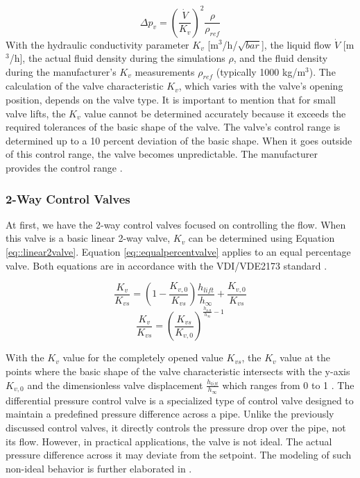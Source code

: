\begin{equation}\label{eq::realminorpres}
    \Delta p_{v} = \left( \frac{\dot{V}}{K_v} \right)^{2} \frac{\rho}{\rho_{ref}}    
\end{equation}
With the hydraulic conductivity parameter $K_v$  [m$^3$/h/$\sqrt{bar}$], the liquid flow $\dot{V}$ [m$^3$/h], the actual fluid density during the simulations $\rho$, and the fluid density during the manufacturer's $K_v$ measurements $\rho_{ref}$ (typically 1000 kg/m$^3$). The calculation of the valve characteristic $K_v$, which varies with the valve's opening position, depends on the valve type. It is important to mention that for small valve lifts, the $K_v$ value cannot be determined accurately because it exceeds the required tolerances of the basic shape of the valve. The valve's control range is determined up to a 10 percent deviation of the basic shape. When it goes outside of this control range, the valve becomes unpredictable. The manufacturer provides the control range \cite{echtephdthesis}.

\subsubsection{2-Way Control Valves}
At first, we have the 2-way control valves focused on controlling the flow. When this valve is a basic linear 2-way valve, $K_v$ can be determined using Equation \ref{eq::linear2valve}. Equation \ref{eq::equalpercentvalve} applies to an equal percentage valve. Both equations are in accordance with the VDI/VDE2173 standard \cite{VDI/VDE2713}. 

\begin{equation}\label{eq::linear2valve}
    \frac{K_v}{K_{vs}} = \left( 1 -\frac{K_{v,0}}{K_{vs}} \right) \frac{h_{lift}}{h_{\infty}} + \frac{K_{v,0}}{K_{vs}}
\end{equation}
\begin{equation}\label{eq::equalpercentvalve}
    \frac{K_v}{K_{vs}} = {\left(\frac{K_{vs}}{K_{v,0}} \right)}^{\frac{h_{lift}}{h_{\infty}} - 1}
\end{equation}

With the $K_v$ value for the completely opened value $K_{vs}$, the $K_v$ value at the points where the basic shape of the valve characteristic intersects with the y-axis $K_{v,0}$ and the dimensionless valve displacement $\frac{h_{lift}}{h_{\infty}}$ which ranges from 0 to 1 \cite{Artikelphdchris}. The differential pressure control valve is a specialized type of control valve designed to maintain a predefined pressure difference across a pipe. Unlike the previously discussed control valves, it directly controls the pressure drop over the pipe, not its flow. However, in practical applications, the valve is not ideal. The actual pressure difference across it may deviate from the setpoint. The modeling of such non-ideal behavior is further elaborated in \cite{echtephdthesis}.


